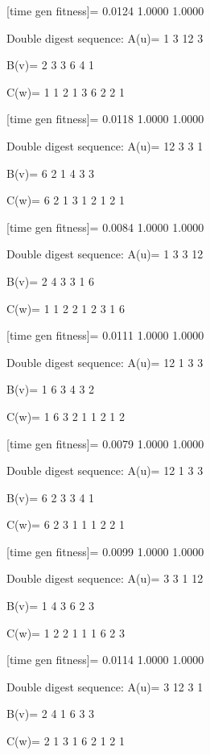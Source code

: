 [time gen fitness]=
    0.0124    1.0000    1.0000

Double digest sequence:
A(u)=
     1     3    12     3

B(v)=
     2     3     3     6     4     1

C(w)=
     1     1     2     1     3     6     2     2     1

[time gen fitness]=
    0.0118    1.0000    1.0000

Double digest sequence:
A(u)=
    12     3     3     1

B(v)=
     6     2     1     4     3     3

C(w)=
     6     2     1     3     1     2     1     2     1

[time gen fitness]=
    0.0084    1.0000    1.0000

Double digest sequence:
A(u)=
     1     3     3    12

B(v)=
     2     4     3     3     1     6

C(w)=
     1     1     2     2     1     2     3     1     6

[time gen fitness]=
    0.0111    1.0000    1.0000

Double digest sequence:
A(u)=
    12     1     3     3

B(v)=
     1     6     3     4     3     2

C(w)=
     1     6     3     2     1     1     2     1     2

[time gen fitness]=
    0.0079    1.0000    1.0000

Double digest sequence:
A(u)=
    12     1     3     3

B(v)=
     6     2     3     3     4     1

C(w)=
     6     2     3     1     1     1     2     2     1

[time gen fitness]=
    0.0099    1.0000    1.0000

Double digest sequence:
A(u)=
     3     3     1    12

B(v)=
     1     4     3     6     2     3

C(w)=
     1     2     2     1     1     1     6     2     3

[time gen fitness]=
    0.0114    1.0000    1.0000

Double digest sequence:
A(u)=
     3    12     3     1

B(v)=
     2     4     1     6     3     3

C(w)=
     2     1     3     1     6     2     1     2     1

